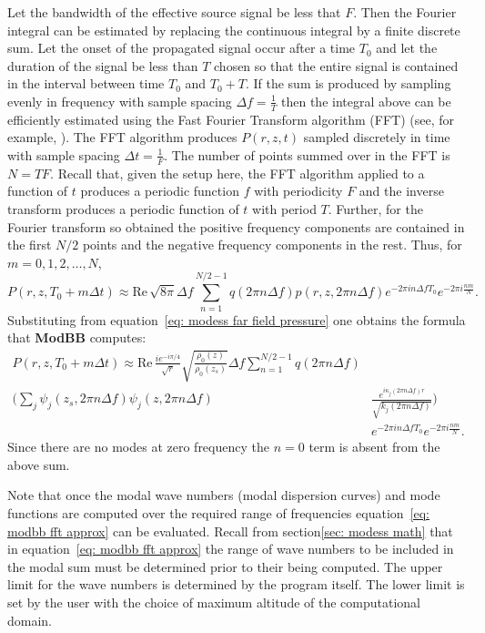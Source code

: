 Let the bandwidth of the effective source signal be less that $F$. Then the Fourier integral can be estimated by replacing the continuous integral by a finite discrete sum. Let the onset of the propagated signal occur after a time $T_0$ and let the duration of the signal be less than $T$ chosen so that the entire signal is contained in the interval between time $T_0$ and $T_0+T$. If the sum is produced by sampling evenly in frequency with sample spacing $\Delta f=\frac{1}{T}$ then the integral above can be efficiently estimated using the Fast Fourier Transform algorithm (FFT) (see, for example, \cite{Press:2007:NRE:1403886}). The FFT algorithm produces $P(r,z,t)$ sampled discretely in time with sample spacing $\Delta t=\frac{1}{F}$. The number of points summed over in the FFT is $N=TF$. Recall that, given the setup here, the FFT algorithm applied to a function of $t$ produces a periodic function $f$ with periodicity $F$ and the inverse transform produces a periodic function of $t$ with period $T$. Further, for the Fourier transform so obtained the positive frequency components are contained in the first $N/2$ points and the negative frequency components in the rest. Thus, for $m=0,1,2,\dots,N$, 
\[
P(r,z,T_0+m\Delta t) 
\approx 
\text{Re}\,\sqrt{8\pi}\Delta f \sum_{n=1}^{N/2-1} q(2\pi n\Delta f)p(r,z,2\pi n\Delta f)e^{-2\pi in\Delta fT_0}e^{-2\pi i\frac{nm}{N}}.
\]
Substituting from equation~\ref{eq: modess far field pressure} one obtains the formula that {\bf ModBB} computes: 
\begin{align}
P(r,z,T_0+m\Delta t) 
\approx 
\text{Re}\,\frac{i e^{-i \pi /4}}{\sqrt{r}} \sqrt{\frac {\rho_0(z)} {\rho_0(z_s)}} 
\Delta f \sum_{n=1}^{N/2-1} q(2\pi n\Delta f)&
\nonumber\\
\Big(\sum_j\psi_j(z_s,2\pi n\Delta f)\psi_j(z,2\pi n\Delta f) &
\frac{e^{i \kappa_j(2\pi n\Delta f)r}}{\sqrt{k_j(2\pi n\Delta f)}}\Big)
\nonumber\\&
e^{-2\pi in\Delta fT_0}e^{-2\pi i\frac{nm}{N}}.
\label{eq: modbb fft approx}
\end{align}
Since there are no modes at zero frequency the $n=0$ term is absent from the above sum. 

Note that once the modal wave numbers (modal dispersion curves) and mode functions are computed over the required range of frequencies equation~\ref{eq: modbb fft approx} can be evaluated. Recall from section\ref{sec: modess math} that in equation~\ref{eq: modbb fft approx} the range of wave numbers to be included in the modal sum must be determined prior to their being computed. The upper limit for the wave numbers is determined by the program itself. The lower limit is set by the user with the choice of maximum altitude of the computational domain. 

